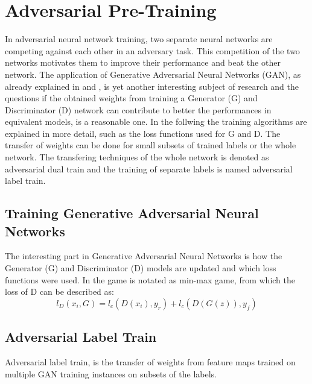 
\section{Adversarial Pre-Training}\label{sec:nn_adv}
\thesisStateNotReady
In adversarial neural network training, two separate neural networks are competing against each other in an adversary task.
This competition of the two networks motivates them to improve their performance and beat the other network.
The application of Generative Adversarial Neural Networks (GAN), as already explained in  and , is yet another interesting subject of research and the questions if the obtained weights from training a Generator (G) and Discriminator (D) network can contribute to better the performances in equivalent models, is a reasonable one.
In the follwing the training algorithms are explained in more detail, such as the loss functions used for G and D.
The transfer of weights can be done for small subsets of trained labels or the whole network.
The transfering techniques of the whole network is denoted as adversarial dual train and the training of separate labels is named adversarial label train.



\subsection{Training Generative Adversarial Neural Networks}
The interesting part in Generative Adversarial Neural Networks is how the Generator (G) and Discriminator (D) models are updated and which loss functions were used.
In  the game is notated as min-max game, from which the loss of D can be described as:
\begin{equation}
  l_D(x_i, G) = l_c(D(x_i), y_r) + l_c(D(G(z)), y_f)
\end{equation}



\subsection{Adversarial Label Train}
Adversarial label train, is the transfer of weights from feature maps trained on multiple GAN training instances on subsets of the labels.

